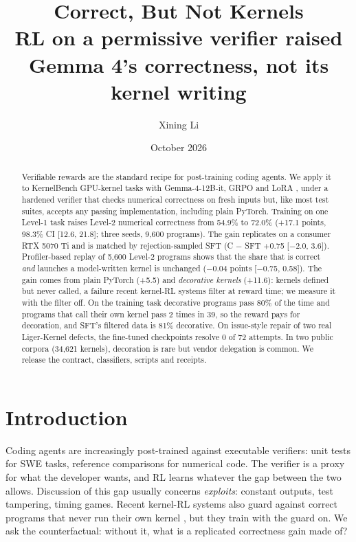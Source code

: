\documentclass[11pt]{article}
\title{Correct, But Not Kernels\\[0.5em]\large RL on a permissive verifier raised Gemma 4's correctness, not its kernel writing}
\author{Xining Li}
\date{October 2026}
\begin{document}
\maketitle

\begin{abstract}
Verifiable rewards are the standard recipe for post-training coding agents. We apply
it to KernelBench GPU-kernel tasks with Gemma-4-12B-it, GRPO \cite{r11} and LoRA \cite{r12}, under
a hardened verifier that checks numerical correctness on fresh inputs but, like most
test suites, accepts any passing implementation, including plain PyTorch. Training on
one Level-1 task raises Level-2 numerical correctness from 54.9\% to 72.0\% (+17.1
points, 98.3\% CI {[}12.6, 21.8{]}; three seeds, 9,600 programs). The gain replicates on a
consumer RTX 5070 Ti and is matched by rejection-sampled SFT (C − SFT +0.75 {[}−2.0, 3.6{]}).
Profiler-based replay of 5,600 Level-2 programs shows that the share that is correct
\emph{and} launches a model-written kernel is unchanged (−0.04 points {[}−0.75, 0.58{]}). The
gain comes from plain PyTorch (+5.5) and \emph{decorative kernels} (+11.6): kernels defined
but never called, a failure recent kernel-RL systems filter at reward time; we measure
it with the filter off. On the training task decorative programs pass 80\% of the time
and programs that call their own kernel pass 2 times in 39, so the reward pays for
decoration, and SFT's filtered data is 81\% decorative. On issue-style repair of two
real Liger-Kernel defects, the fine-tuned checkpoints resolve 0 of 72 attempts. In two
public corpora (34,621 kernels), decoration is rare but vendor delegation is common.
We release the contract, classifiers, scripts and receipts.
\end{abstract}

\section{Introduction}\label{introduction}

Coding agents are increasingly post-trained against executable verifiers: unit tests
for SWE tasks, reference comparisons for numerical code. The verifier is a proxy for
what the developer wants, and RL learns whatever the gap between the two allows.
Discussion of this gap usually concerns \emph{exploits}: constant outputs, test tampering,
timing games. Recent kernel-RL systems also guard against correct programs that never
run their own kernel \cite{r14,r15}, but they train with the guard on. We ask the
counterfactual: without it, what is a replicated correctness gain made of?
\end{document}
